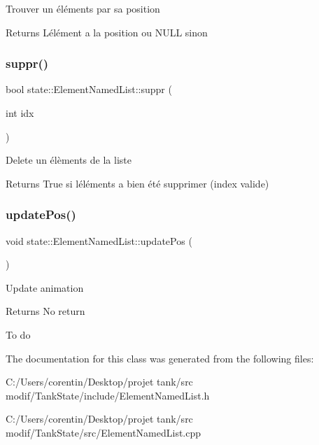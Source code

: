 Trouver un éléments par sa position \begin{DoxyReturn}{Returns}
L\textquotesingle{}élément a la position ou N\+U\+LL sinon 
\end{DoxyReturn}
\mbox{\label{classstate_1_1_element_named_list_a96b53623f9c61dd9867718b87f20ff03}} 
\subsubsection{\texorpdfstring{suppr()}{suppr()}}
{\footnotesize\ttfamily bool state\+::\+Element\+Named\+List\+::suppr (\begin{DoxyParamCaption}\item[{int}]{idx }\end{DoxyParamCaption})}

Delete un élèments de la liste \begin{DoxyReturn}{Returns}
True si l\textquotesingle{}éléments a bien été supprimer (index valide) 
\end{DoxyReturn}
\mbox{\label{classstate_1_1_element_named_list_a8f16293821685af35edfc3f77be55a5f}} 
\subsubsection{\texorpdfstring{update\+Pos()}{updatePos()}}
{\footnotesize\ttfamily void state\+::\+Element\+Named\+List\+::update\+Pos (\begin{DoxyParamCaption}{ }\end{DoxyParamCaption})}

Update animation \begin{DoxyReturn}{Returns}
No return 
\end{DoxyReturn}
To do 

The documentation for this class was generated from the following files\+:\begin{DoxyCompactItemize}
\item 
C\+:/\+Users/corentin/\+Desktop/projet tank/src modif/\+Tank\+State/include/Element\+Named\+List.\+h\item 
C\+:/\+Users/corentin/\+Desktop/projet tank/src modif/\+Tank\+State/src/Element\+Named\+List.\+cpp\end{DoxyCompactItemize}
